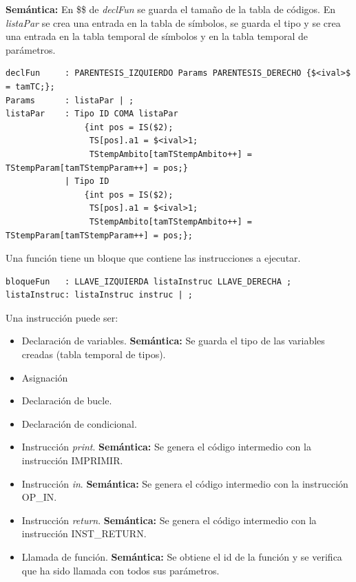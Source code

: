 \documentclass[a4paper,12pt]{article}
\begin{document}
\begin{enumerate}
\begin{enumerate}
\begin{itemize}
   \textbf{Semántica:} En \$\$ de \textit{declFun} se guarda el tamaño de la tabla de códigos. En \textit{listaPar} se crea una entrada en la tabla de símbolos,
   se guarda el tipo y se crea una entrada en la tabla temporal de símbolos y en la tabla temporal de parámetros.
   \begin{lstlisting}
declFun		: PARENTESIS_IZQUIERDO Params PARENTESIS_DERECHO {$<ival>$ = tamTC;};
Params		: listaPar | ;
listaPar	: Tipo ID COMA listaPar 
				{int pos = IS($2);
				 TS[pos].a1 = $<ival>1;
				 TStempAmbito[tamTStempAmbito++] = TStempParam[tamTStempParam++] = pos;}
			| Tipo ID 
				{int pos = IS($2);
				 TS[pos].a1 = $<ival>1;
				 TStempAmbito[tamTStempAmbito++] = TStempParam[tamTStempParam++] = pos;};
   \end{lstlisting}
   Una función tiene un bloque que contiene las instrucciones a ejecutar.
   \begin{lstlisting}
bloqueFun 	: LLAVE_IZQUIERDA listaInstruc LLAVE_DERECHA ;
listaInstruc: listaInstruc instruc | ;
   \end{lstlisting}
   Una instrucción puede ser:
   \begin{itemize}
    \item Declaración de variables. \textbf{Semántica:} Se guarda el tipo de las variables creadas (tabla temporal de tipos).
    \item Asignación 
    \item Declaración de bucle.
    \item Declaración de condicional. 
    \item Instrucción \textit{print}. \textbf{Semántica:} Se genera el código intermedio con la instrucción IMPRIMIR.
    \item Instrucción \textit{in}. \textbf{Semántica:} Se genera el código intermedio con la instrucción OP\_IN.
    \item Instrucción \textit{return}. \textbf{Semántica:} Se genera el código intermedio con la instrucción INST\_RETURN.
    \item Llamada de función. \textbf{Semántica:} Se obtiene el id de la función y se verifica que ha sido llamada con todos sus parámetros.
   \end{itemize}
   

\end{itemize}
\end{enumerate}
\end{enumerate}
\end{document}
